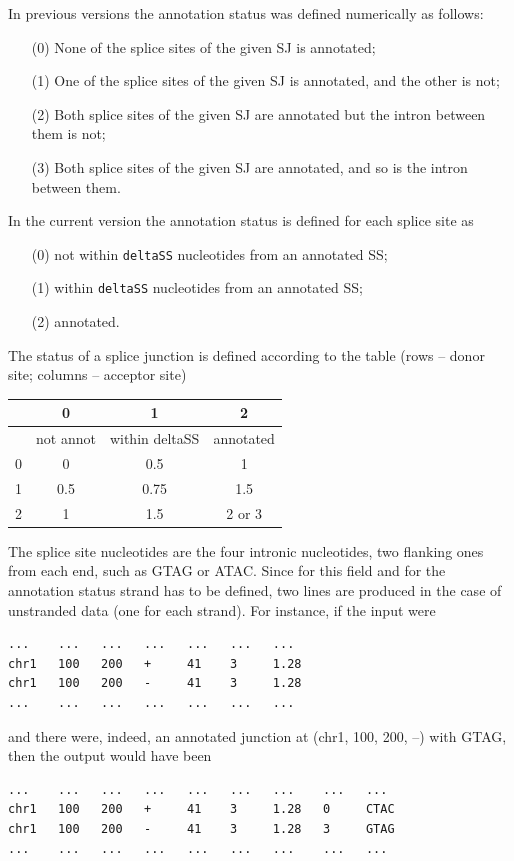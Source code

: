 \documentclass{article}
\begin{document}
In previous versions the annotation status was defined numerically as follows:
\begin{enumerate}
\item[(0)] None of the splice sites of the given SJ is annotated;
\item[(1)] One of the splice sites of the given SJ is annotated, and the other is not;
\item[(2)] Both splice sites of the given SJ are annotated but the intron between them is not;
\item[(3)] Both splice sites of the given SJ are annotated, and so is the intron between them.
\end{enumerate}

In the current version the annotation status is defined for each splice site as
\begin{enumerate}
\item[(0)] not within {\tt deltaSS} nucleotides from an annotated SS;
\item[(1)] within {\tt deltaSS} nucleotides from an annotated SS;
\item[(2)] annotated.
\end{enumerate}

The status of a splice junction is defined according to the table (rows -- donor site; columns -- acceptor site)\\
\begin{center}
\begin{tabular}{|c|c|c|c|}
\hline
 	& 0 & 1 & 2\\
\hline
 	& not annot & within deltaSS & annotated\\
\hline
0	&0 	&0.5 	& 1\\
\hline
1	&0.5 	&0.75 	& 1.5\\
\hline
2	&1	&1.5	&2 or 3\\
\hline
\end{tabular}
\end{center}


The splice site nucleotides are the four intronic nucleotides, two flanking ones from each end, such as GTAG or ATAC. Since for this field and for the annotation status strand 
has to be defined, two lines are produced in the case of unstranded data (one for each strand). For instance, if the input were
\begin{verbatim}
...    ...   ...   ...   ...   ...   ...
chr1   100   200   +     41    3     1.28
chr1   100   200   -     41    3     1.28
...    ...   ...   ...   ...   ...   ...
\end{verbatim}
and there were, indeed, an annotated junction at (chr1, 100, 200, --) with GTAG, then the output would have been
\begin{verbatim}
...    ...   ...   ...   ...   ...   ...    ...   ...
chr1   100   200   +     41    3     1.28   0     CTAC
chr1   100   200   -     41    3     1.28   3     GTAG
...    ...   ...   ...   ...   ...   ...    ...   ...
\end{verbatim}
\end{document}
